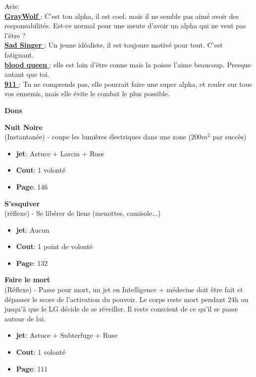 \documentclass[oneside,12pt]{book}
\newcommand\don[6]{
\textbf{#1} \\
(#6) - #2
\begin{itemize}
\item{ \textbf{jet}: #3}
\item{ \textbf{Cout}: #4}
\item{ \textbf{Page}: #5}
\end{itemize}
\vspace{0.5cm}
}
\newcommand{\Glen}{\textbf{GrayWolf} }
\newcommand{\Mathew}{\textbf{Sad Singer} }
\newcommand{\Laura}{\textbf{blood queen} }
\newcommand{\Kelly}{\textbf{911} }
\begin{document}
\begin{flushleft}
\begin{description}
{Avis:\\
\underline{\Glen} :  C'est ton alpha, il est cool. mais il ne semble pas aimé avoir des responsabilités. Est-ce normal pour une meute d'avoir un alpha qui ne veut pas l'être ?\\
\underline{\Mathew} : Un jeune idéaliste, il est toujours motivé pour tout. C'est fatiguant.\\
\underline{\Laura} : elle est loin d'être conne mais la poisse l'aime beaucoup. Presque autant que toi. \\
\underline{\Kelly}: Tu ne comprends pas, elle pourrait faire une super alpha, et rouler sur tous vos ennemis, mais elle évite le combat le plus possible.\\
}
\end{description}
\clearpage
\textbf{\large Dons}
\vspace{0.5cm}

\don{Nuit Noire}{coupe les lumières électriques dans une zone (\begin{math}200m^2\end{math} par succès)}{Astuce + Larcin + Ruse}{1 volonté}{146}{Instantanée}
\don{S'esquiver}{Se libérer de liens (menottes, camisole...)}{Aucun}{1 point de volonté}{132}{réflexe}
\don{Faire le mort}{Passe pour mort, un jet en Intelligence + médecine doit être fait et dépasser le score de l'activation du pouvoir. Le corps reste mort pendant 24h ou jusqu'à que le LG décide de se réveiller. Il reste conscient de ce qu'il se passe autour de lui.}{Astuce + Subterfuge + Ruse}{1 volonté}{111}{Réflexe}

\clearpage

\end{flushleft}
\end{document}
